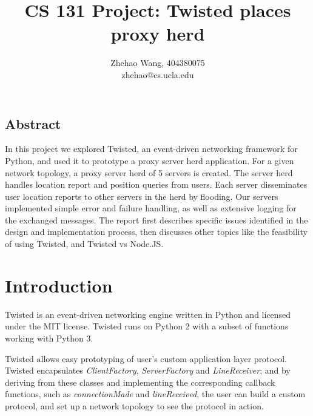 \documentclass[letterpaper,twocolumn,10pt]{article}
\begin{document}
\date{}

\title{\Large \bf CS 131 Project: Twisted places proxy herd}

\author{
{\rm Zhehao Wang, 404380075}\\
zhehao@cs.ucla.edu
} %

\maketitle

\thispagestyle{empty}


\subsection*{Abstract}

In this project we explored Twisted, an event-driven networking framework for Python, and used it to prototype a proxy server herd application. For a given network topology, a proxy server herd of 5 servers is created. The server herd handles location report and position queries from users. Each server disseminates user location reports to other servers in the herd by flooding. Our servers implemented simple error and failure handling, as well as extensive logging for the exchanged messages. The report first describes specific issues identified in the design and implementation process, then discusses other topics like the feasibility of using Twisted, and Twisted vs Node.JS.

\section{Introduction}

Twisted is an event-driven networking engine written in Python and licensed under the ​MIT license. Twisted runs on Python 2 with a subset of functions working with Python 3. \cite{TwistedSite}

Twisted allows easy prototyping of user's custom application layer protocol. Twisted encapsulates \textit{ClientFactory}, \textit{ServerFactory} and \textit{LineReceiver}; and by deriving from these classes and implementing the corresponding callback functions, such as \textit{connectionMade} and \textit{lineReceived}, the user can build a custom protocol, and set up a network topology to see the protocol in action.
\end{document}

